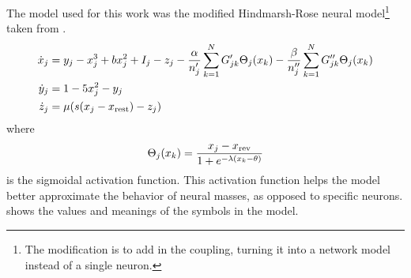 The model used for this work was the modified Hindmarsh-Rose neural model\footnote{The modification is to add in the coupling, turning it into a network model instead of a single neuron.} taken from \cite{Santos2017}.
\begin{align}
  \label{eq:hr_x}
  \dot{\hrx}_{j}
  &=
    \hry_{j}
    -
    \hrx_{j}^{3}
    +
    b \hrx_{j}^{2}
    +
    I_{j}
    -
    \hrz_{j}
    -
    \frac{\hra}{n'_{j}} \sum_{k = 1}^{N} G'_{j k} \Theta_{j}(\hrx_{k})
    -
    \frac{\hrb}{n''_{j}} \sum_{k = 1}^{N} G''_{j k} \Theta_{j}(\hrx_{k}) \\
  \label{eq:hr_y}
  \dot{\hry}_{j}
  &=
    1
    -
    5 \hrx_{j}^{2}
    -
    \hry_{j} \\
  \label{eq:hr_z}
  \dot{\hrz}_{j}
  &=
    \mu \pqty{s \pqty{\hrx_{j} - \hrx_{\text{rest}}} - \hrz_{j}}
\end{align}
where
\begin{equation}
  \label{eq:hr_sigmoid}
  \Theta_{j}(\hrx_{k})
  =
  \frac{\hrx_{j} - \hrx_{\text{rev}}}{1 + e^{-\lambda \pqty{\hrx_{k} - \theta}}}
\end{equation}
is the sigmoidal activation function.
This activation function helps the model better approximate the behavior of neural masses, as opposed to specific neurons.
 shows the values and meanings of the symbols in the model.

